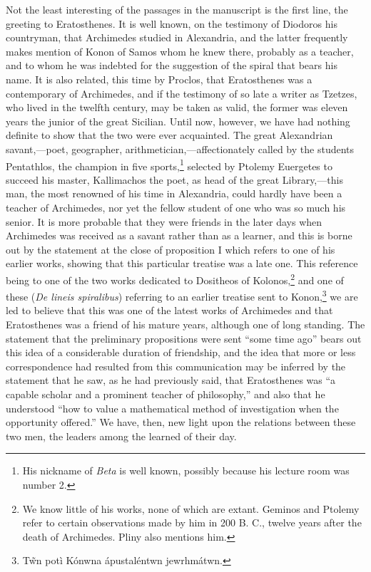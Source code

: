 \documentclass[12pt]{article}
\begin{document}
Not the least interesting of the passages in the manuscript is the
first line, the greeting to Eratosthenes. It is well known, on the
testimony of Diodoros his countryman, that Archimedes studied in
Alexandria, and the latter frequently makes mention of Konon of Samos
whom he knew there, probably as a teacher, and to whom he was indebted
for the suggestion of the spiral that bears his name. It is also
related, this time by Proclos, that Eratosthenes was a contemporary of
Archimedes, and if the testimony of so late a writer as Tzetzes, who
lived in the twelfth century, may be taken as valid, the former was
eleven years the junior of the great Sicilian. Until now, however, we
have had nothing definite to show that the two were ever
acquainted. The great Alexandrian savant,---poet, geographer,
arithmetician,---affectionately called by the students Pentathlos, the
champion in five sports,\footnote{His nickname of \emph{Beta} is well
known, possibly because his lecture room was number 2.} selected by
Ptolemy Euergetes to succeed his master, Kallimachos the poet, as head
of the great Library,---this man, the most renowned of his time in
Alexandria, could hardly have been a teacher of Archimedes, nor yet
the fellow student of one who was so much his senior. It is more
probable that they were friends in the later days when Archimedes was
received as a savant rather than as a learner, and this is borne out
by the statement at the close of proposition I which refers to one of
his earlier works, showing that this particular treatise was a late
one. This reference being to one of the two works dedicated to
Dositheos of Kolonos,\footnote{We know little of his works, none of
which are extant. Geminos and Ptolemy refer to certain observations
made by him in 200 B. C., twelve years after the death of
Archimedes. Pliny also mentions him.} and one of these (\emph{De
lineis spiralibus}) referring to an earlier treatise sent to
Konon,\footnote{ T\~wn pot\`i K\'onwna
\'apustal\'entwn jewrhm\'atwn.} we are led to believe that this was
one of the latest works of Archimedes and that Eratosthenes was a
friend of his mature years, although one of long standing. The
statement that the preliminary propositions were sent ``some time
ago'' bears out this idea of a considerable duration of friendship,
and the idea that more or less correspondence had resulted from this
communication may be inferred by the statement that he saw, as he had
previously said, that Eratosthenes was ``a capable scholar and a
prominent teacher of philosophy,'' and also that he understood ``how
to value a mathematical method of investigation when the opportunity
offered.'' We have, then, new light upon the relations between these
two men, the leaders among the learned of their day.
\end{document}
